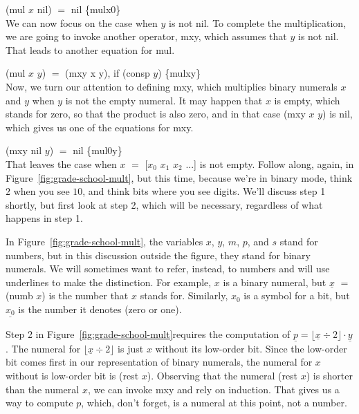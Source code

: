 \hspace*{2cm} \textsf{(mul $x$ nil)} $=$ \textsf{nil} \hspace{2cm} \hfill \{mulx0\}
\\

We can now focus on the case when $y$ is not \textsf{nil}.
To complete the multiplication,
we are going to invoke another operator, \textsf{mxy},
which assumes that $y$ is not \textsf{nil}.
That leads to another equation for \textsf{mul}.

\hspace*{2cm} \textsf{(mul $x$ $y$)} $=$ \textsf{(mxy x y)}, if \textsf{(consp $y$)} \hfill \{mulxy\}
\\

Now, we turn our attention to defining \textsf{mxy}, which multiplies binary
numerals $x$ and $y$ when $y$ is not the empty numeral.
It may happen that $x$ is empty, which stands for zero, so that
the product is also zero, and in that case (mxy $x$ $y$) is \textsf{nil},
which gives us one of the equations for \textsf{mxy}.

\hspace*{2cm} \textsf{(mxy nil $y$)} $=$ \textsf{nil}  \hfill \{mul0y\}
\\

That leaves the case when $x$ $=$ \textsf{[$x_0$ $x_1$ $x_2$ ...]} is not empty.
Follow along, again, in Figure~\ref{fig:grade-school-mult},
but this time, because we're in binary mode, think $2$ when you see $10$,
and think bits where you see digits.
We'll discuss step 1 shortly, but first look at step 2,
which will be necessary, regardless of what happens in step 1.

In Figure~\ref{fig:grade-school-mult}, the variables $x$, $y$, $m$, $p$, and $s$
stand for numbers, but in this discussion outside the figure,
they stand for binary numerals.
We will sometimes want to refer, instead, to numbers
and will use underlines to make the distinction.
For example, $x$ is a binary numeral,
but $\underline{x}$ $=$ \textsf{(numb $x$)}
is the number that $x$ stands for.
Similarly, $x_0$ is a symbol for a bit,
but $\underline{x_0}$ is the number it denotes (zero or one).

Step 2 in Figure~\ref{fig:grade-school-mult}requires the computation of
$\underline{p} = \lfloor \underline{x} \div 2 \rfloor \cdot \underline{y}$.
The numeral for $\lfloor \underline{x} \div 2 \rfloor$ is just $x$ without its
low-order bit. Since the low-order bit comes first
in our representation of binary numerals,
the numeral for $x$ without is low-order bit is \textsf{(rest $x$)}.
Observing that the numeral \textsf{(rest $x$)}
is shorter than the numeral $x$,
we can invoke \textsf{mxy} and rely on induction.
That gives us a way to compute $p$, which, don't forget,
is a numeral at this point, not a number.


